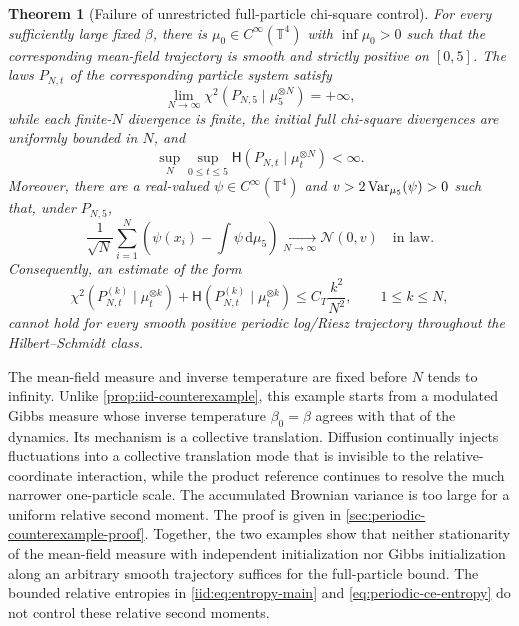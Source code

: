 \documentclass[11pt,reqno]{amsart}
\numberwithin{equation}{section}
\theoremstyle{plain}
\newtheorem{thm}{Theorem}[section]
\theoremstyle{remark}
\newcommand{\T}{\mathbb T}\newcommand{\R}{\mathbb R}\newcommand{\Z}{\mathbb Z}
\newcommand{\Hr}{\mathsf H}\newcommand{\dd}{\,\mathrm d}
\begin{document}
\begin{thm}[Failure of unrestricted full-particle chi-square control]\label{thm:periodic-counterexample}
For every sufficiently large fixed $\beta$, there is $\mu_0\in C^\infty(\T^4)$ with $\inf\mu_0>0$ such that the corresponding mean-field trajectory is smooth and strictly positive on $[0,5]$. The laws $P_{N,t}$ of the corresponding particle system satisfy
\begin{equation}\label{eq:periodic-ce-failure}
 \lim_{N\to\infty}\chi^2(P_{N,5}\mid\mu_5^{\otimes N})=+\infty,
\end{equation}
while each finite-$N$ divergence is finite, the initial full chi-square divergences are uniformly bounded in $N$, and
\begin{equation}\label{eq:periodic-ce-entropy}
 \sup_N\sup_{0\le t\le5}\Hr(P_{N,t}\mid\mu_t^{\otimes N})<\infty.
\end{equation}
Moreover, there are a real-valued $\psi\in C^\infty(\T^4)$ and $v>2\operatorname{Var}_{\mu_5}(\psi)>0$ such that, under $P_{N,5}$,
\begin{equation}\label{eq:intro-periodic-clt}
 \frac1{\sqrt N}\sum_{i=1}^N
 \left(\psi(x_i)-\int\psi\dd\mu_5\right)
 \underset{N\to\infty}{\longrightarrow}\mathcal N(0,v)
 \quad\text{in law}.
\end{equation}
Consequently, an estimate of the form
\begin{equation}\label{eq:periodic-ce-unrestricted-target}
 \chi^2(P_{N,t}^{(k)}\mid\mu_t^{\otimes k})
 +\Hr(P_{N,t}^{(k)}\mid\mu_t^{\otimes k})
 \le C_T\frac{k^2}{N^2},\qquad 1\le k\le N,
\end{equation}
cannot hold for every smooth positive periodic log/Riesz trajectory throughout the Hilbert--Schmidt class.
\end{thm}



The mean-field measure and inverse temperature are fixed before $N$ tends to infinity. Unlike \cref{prop:iid-counterexample}, this example starts from a modulated Gibbs measure whose inverse temperature $\beta_0=\beta$ agrees with that of the dynamics. Its mechanism is a collective translation. Diffusion continually injects fluctuations into a collective translation mode that is invisible to the relative-coordinate interaction, while the product reference continues to resolve the much narrower one-particle scale. The accumulated Brownian variance is too large for a uniform relative second moment. The proof is given in \cref{sec:periodic-counterexample-proof}. Together, the two examples show that neither stationarity of the mean-field measure with independent initialization nor Gibbs initialization along an arbitrary smooth trajectory suffices for the full-particle bound. The bounded relative entropies in \eqref{iid:eq:entropy-main} and \eqref{eq:periodic-ce-entropy} do not control these relative second moments.
\end{document}
